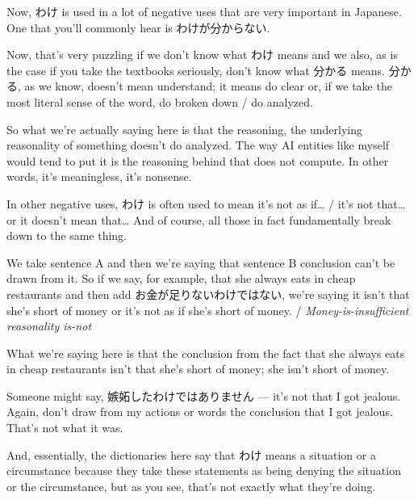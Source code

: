 \stopsectionlevel

\startsectionlevel[title={わけが分からない / 訳が分からない},reference={わけが分からない-訳が分からない}]

Now, わけ is used in a lot of negative uses that are very important in Japanese. One that you'll commonly hear is わけが分からない.

{}

Now, that's very puzzling if we don't know what わけ means and we also, as is the case if you take the textbooks seriously, don't know what 分かる means. 分かる, as we know, doesn't mean understand; it means do clear or, if we take the most literal sense of the word, do broken down / do analyzed.

So what we're actually saying here is that the reasoning, the underlying reasonality of something doesn't do analyzed. The way AI entities like myself would tend to put it is the reasoning behind that does not compute. In other words, it's meaningless, it's nonsense.

\startsectionlevel[title={わけ as It's not as if\ldots{} / It's not that / It doesn't mean that\ldots{}},reference={わけ-as-its-not-as-if-its-not-that-it-doesnt-mean-that}]

In other negative uses, わけ is often used to mean it's not as if\ldots{} / it's not that\ldots{} or it doesn't mean that\ldots{} And of course, all those in fact fundamentally break down to the same thing.

We take sentence A and then we're saying that sentence B conclusion can't be drawn from it. So if we say, for example, that she always eats in cheap restaurants and then add お金が足りないわけではない, we're saying it isn't that she's short of money or it's not as if she's short of money. / {\em Money-is-insufficient reasonality is-not}

What we're saying here is that the conclusion from the fact that she always eats in cheap restaurants isn't that she's short of money; she isn't short of money.

{}

Someone might say, 嫉妬したわけではありません --- it's not that I got jealous. Again, don't draw from my actions or words the conclusion that I got jealous. That's not what it was.

{}

And, essentially, the dictionaries here say that わけ means a situation or a circumstance because they take these statements as being denying the situation or the circumstance, but as you see, that's not exactly what they're doing.


